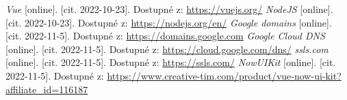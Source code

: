 \begin{thebibliography}{99}

  \textit{Vue} [online]. [cit. 2022-10-23]. Dostupné z: \url{https://vuejs.org/}
  \textit{NodeJS} [online]. [cit. 2022-10-23]. Dostupné z: \url{https://nodejs.org/en/}
  \textit{Google domains} [online]. [cit. 2022-11-5]. Dostupné z: \url{https://domains.google.com}
  \textit{Google Cloud DNS} [online]. [cit. 2022-11-5]. Dostupné z: \url{https://cloud.google.com/dns/}
  \textit{ssls.com} [online]. [cit. 2022-11-5]. Dostupné z: \url{https://ssls.com/}
  \textit{NowUIKit} [online]. [cit. 2022-11-5]. Dostupné z: \url{https://www.creative-tim.com/product/vue-now-ui-kit?affiliate_id=116187}
  

\end{thebibliography}
